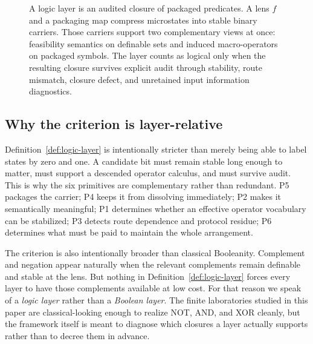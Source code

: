 \documentclass[11pt]{article}
\theoremstyle{definition}
\begin{document}
\begin{figure}[t]
{
 }
    \caption{A logic layer is an audited closure of packaged predicates. A lens \(f\) and a packaging map compress microstates into stable binary carriers. Those carriers support two complementary views at once: feasibility semantics on definable sets and induced macro-operators on packaged symbols. The layer counts as logical only when the resulting closure survives explicit audit through stability, route mismatch, closure defect, and unretained input information diagnostics.}
    \label{fig:logic-layer-overview}
\end{figure}

\subsection{Why the criterion is layer-relative}

Definition~\ref{def:logic-layer} is intentionally stricter than merely being able to label states by zero and one. A candidate bit must remain stable long enough to matter, must support a descended operator calculus, and must survive audit. This is why the six primitives are complementary rather than redundant. P5 packages the carrier; P4 keeps it from dissolving immediately; P2 makes it semantically meaningful; P1 determines whether an effective operator vocabulary can be stabilized; P3 detects route dependence and protocol residue; P6 determines what must be paid to maintain the whole arrangement.

The criterion is also intentionally broader than classical Booleanity. Complement and negation appear naturally when the relevant complements remain definable and stable at the lens. But nothing in Definition~\ref{def:logic-layer} forces every layer to have those complements available at low cost. For that reason we speak of a \emph{logic layer} rather than a \emph{Boolean layer}. The finite laboratories studied in this paper are classical-looking enough to realize NOT, AND, and XOR cleanly, but the framework itself is meant to diagnose which closures a layer actually supports rather than to decree them in advance.
\end{document}
